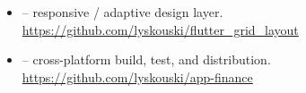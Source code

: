 \begin{itemize}
\item {} -- responsive / adaptive design layer.\\
\href{https://github.com/lyskouski/flutter\_grid\_layout}{https://github.com/lyskouski/flutter\_grid\_layout}

\item {} -- cross-platform build, test, and distribution.\\
\href{https://github.com/lyskouski/app-finance/tree/main/.github/workflows}{https://github.com/lyskouski/app-finance}

\end{itemize}